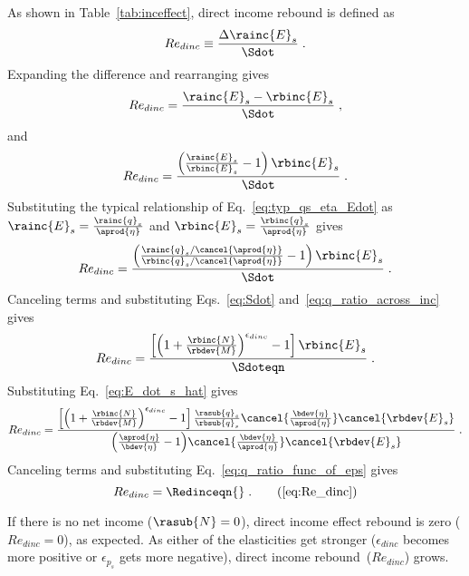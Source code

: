 As shown in Table~\ref{tab:inceffect}, direct income rebound is defined as
%
\begin{equation} \label{eq:Re_dinc_def}
  Re_{dinc} \equiv \frac{\Delta \rainc{E}_s}{\Sdot} \; .
\end{equation}
%
Expanding the difference and rearranging gives
%
\begin{equation}
  Re_{dinc} = \frac{\rainc{E}_s - \rbinc{E}_s}{\Sdot} \; , 
\end{equation}
%
and
%
\begin{equation}
  Re_{dinc} = \frac{\left( \frac{\rainc{E}_s}{\rbinc{E}_s} - 1  \right) \rbinc{E}_s}{\Sdot} \; .
\end{equation}
%
Substituting the typical relationship of Eq.~\ref{eq:typ_qs_eta_Edot} as
$\rainc{E}_s = \frac{\rainc{q}_s}{\aprod{\eta}}$ and  
$\rbinc{E}_s = \frac{\rbinc{q}_s}{\aprod{\eta}}$ gives
%
\begin{equation}
  Re_{dinc} = \frac{\left( \frac{\rainc{q}_s / \cancel{\aprod{\eta}}}{\rbinc{q}_s / \cancel{\aprod{\eta}}} - 1  \right) \rbinc{E}_s} 
              {\Sdot} \; .
\end{equation}
%
Canceling terms and substituting Eqs.~\ref{eq:Sdot} and~\ref{eq:q_ratio_across_inc} gives
%
\begin{equation}
  Re_{dinc} = \frac{\left[ \left( 1 + \frac{\rbinc{N}}{\rbdev{M}} \right) ^{\epsilon_{dinc}} - 1  \right] \rbinc{E}_s} 
              {\Sdoteqn} \; .
\end{equation}
%
Substituting Eq.~\ref{eq:E_dot_s_hat} gives
%
\begin{equation}
  Re_{dinc} = \frac{\left[ \left( 1 + \frac{\rbinc{N}}{\rbdev{M}} \right) ^{\epsilon_{dinc}} - 1  \right] 
                  \frac{\rasub{q}_s}{\rbsub{q}_s}
                \cancel{\frac{\bdev{\eta}}{\aprod{\eta}}}
                \cancel{\rbdev{E}_s}}
              {\left( \frac{\aprod{\eta}}{\bdev{\eta}} - 1 \right)\! \cancel{\frac{\bdev{\eta}}{\aprod{\eta}}} \cancel{\rbdev{E}_s}} \; .
\end{equation}
%
Canceling terms and substituting Eq.~\ref{eq:q_ratio_func_of_eps} gives
%
\begin{equation} 
  Re_{dinc} = \Redinceqn{} \; . \tag{\ref{eq:Re_dinc}}
\end{equation}

If there is no net income ($\rasub{N} = 0$), 
direct income effect rebound is zero ($Re_{dinc} = 0$), as expected.
As either of the elasticities get stronger 
($\epsilon_{dinc}$ becomes more positive or $\epsilon_{p_s}$ gets more negative), 
direct income rebound~($Re_{dinc}$) grows.

